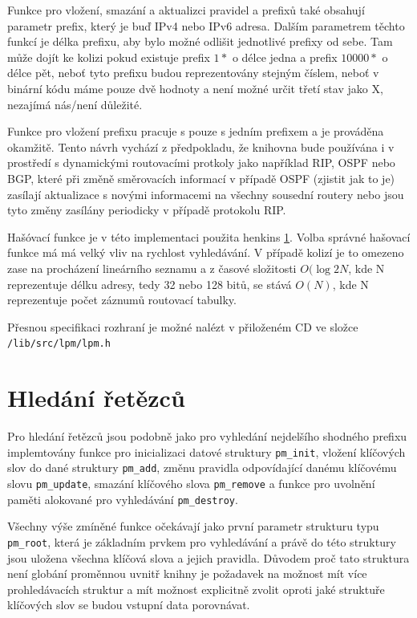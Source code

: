 Funkce pro vložení, smazání a aktualizci pravidel a prefixů také obsahují parametr
prefix, který je buď IPv4 nebo IPv6 adresa. Dalším parametrem těchto funkcí je délka prefixu,
aby bylo možné odlišit jednotlivé prefixy od sebe. Tam může dojít ke kolizi pokud existuje
prefix $1*$ o délce jedna a prefix $10000*$ o délce pět, neboť tyto prefixu budou reprezentovány stejným
číslem, neboť v binární kódu máme pouze dvě hodnoty a není možné určit třetí stav jako X,
nezajímá nás/není důležité.

Funkce pro vložení prefixu pracuje s pouze s jedním prefixem a je prováděna okamžitě.
Tento návrh vychází z předpokladu, že knihovna bude používána i v prostředí s dynamickými routovacími
protkoly jako například RIP, OSPF nebo BGP, které při změně směrovacích informací v případě OSPF (zjistit jak to je)
zasílají aktualizace s novými informacemi na všechny sousední routery nebo jsou tyto změny zasílány periodicky
v případě protokolu RIP.

Hašóvací funkce je v této implementaci použita henkins \ref{}. Volba správné hašovací funkce
má má velký vliv na rychlost vyhledávání. V případě kolizí je to omezeno zase na procházení lineárního
seznamu a z časové složitosti $O(\log{2}{N}$, kde N reprezentuje délku adresy, tedy 32 nebo 128 bitů,
se stává $O(N)$, kde N reprezentuje počet záznumů routovací tabulky.

Přesnou specifikaci rozhraní je možné nalézt v přiloženém CD ve složce \texttt{/lib/src/lpm/lpm.h}


\section{Hledání řetězců}

Pro hledání řetězců jsou podobně jako pro vyhledání nejdelšího shodného prefixu implemtovány
funkce pro inicializaci datové struktury \texttt{pm\_init}, vložení klíčových slov do
dané struktury \texttt{pm\_add}, změnu pravidla odpovídající danému klíčovému slovu
\texttt{pm\_update}, smazání klíčového slova \texttt{pm\_remove} a funkce pro uvolnění
paměti alokované pro vyhledávání \texttt{pm\_destroy}.

Všechny výše zmíněné funkce očekávají jako první parametr strukturu typu \texttt{pm\_root},
která je základním prvkem pro vyhledávání a právě do této struktury
jsou uložena všechna klíčová slova a jejich pravidla. Důvodem proč tato struktura není globání
proměnnou uvnitř knihny je požadavek na možnost mít více prohledávacích struktur
a mít možnost explicitně zvolit oproti jaké struktuře klíčových slov se budou vstupní data porovnávat.

